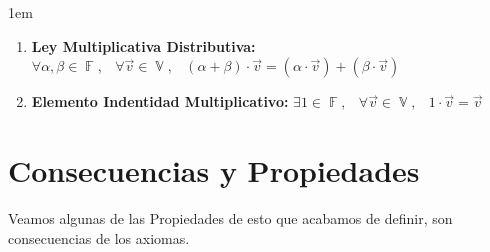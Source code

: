 \documentclass[12pt, fleqn]{report}                             %
\newenvironment{SmallIndentation}[1][0.75em]                    %
        {\begin{adjustwidth}{#1}{}\begin{footnotesize}}             %
        {\end{footnotesize}\end{adjustwidth}}                       %
\DeclareMathOperator \Space {\quad}                             %
\DeclareMathOperator \MiniSpace {\;}                            %
\theoremstyle{break}                                            %
\DeclareMathOperator \GenericField {\mathbb{F}}                 %
\DeclareMathOperator \VectorSet    {\mathbb{V}}                 %
\begin{document}
\begin{SmallIndentation}[1em]
\begin{enumerate}
                        \item 
                            \textbf{Ley Multiplicativa Distributiva:}
                            $\forall \alpha, \beta \in \GenericField, \MiniSpace
                                \forall \vec{v} \in \VectorSet, \MiniSpace
                                    (\alpha + \beta) \cdot \vec{v} = 
                                            (\alpha \cdot \vec{v}) + (\beta \cdot \vec{v})$

                        \item 
                            \textbf{Elemento Indentidad Multiplicativo:}
                            $\exists 1 \in \GenericField, \MiniSpace
                                \forall \vec{v} \in \VectorSet, \MiniSpace 1 \cdot \vec{v} = \vec{v}$

                    \end{enumerate}

                \end{SmallIndentation}




        \clearpage
        \section{Consecuencias y Propiedades}

            Veamos algunas de las Propiedades de esto que acabamos de definir, son consecuencias de los 
            axiomas.
\end{document}
